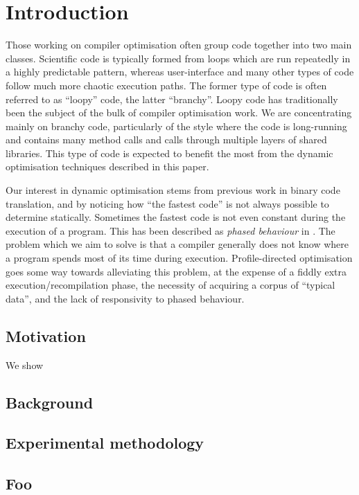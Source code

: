 \chapter{Introduction}

Those working on compiler optimisation often group code together into two main classes. Scientific code is typically formed from loops which are run repeatedly in a highly predictable pattern, whereas user-interface and many other types of code follow much more chaotic execution paths. The former type of code is often referred to as ``loopy'' code, the latter ``branchy''. Loopy code has traditionally been the subject of the bulk of compiler optimisation work. We are concentrating mainly on branchy code, particularly of the style where the code is long-running and contains many method calls and calls through multiple layers of shared libraries. This type of code is expected to benefit the most from the dynamic optimisation techniques described in this paper.

Our interest in dynamic optimisation stems from previous work in binary code translation, and by noticing how ``the fastest code'' is not always possible to determine statically. Sometimes the fastest code is not even constant during the execution of a program. This has been described as {\em phased behaviour} in \cite{WigginsRedstone}. The problem which we aim to solve is that a compiler generally does not know where a program spends most of its time during execution. Profile-directed optimisation goes some way towards alleviating this problem, at the expense of a fiddly extra execution/recompilation phase, the necessity of acquiring a corpus of ``typical data'', and the lack of responsivity to phased behaviour.

\section{Motivation}

We show

\section{Background}

\section{Experimental methodology}

\section{Foo}
